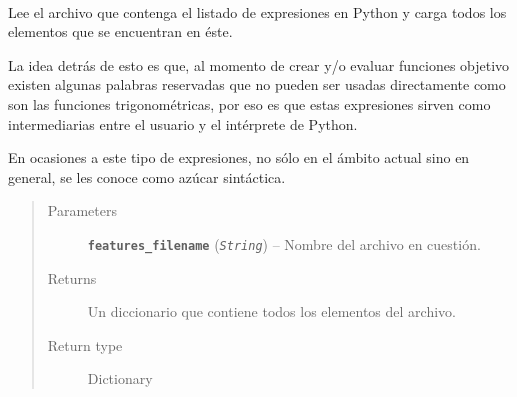 \documentclass[letterpaper,10pt,english]{sphinxmanual}
\begin{document}
\begin{fulllineitems}
\begin{fulllineitems}
\label{Controller/XMLParser:Controller.XMLParser.XMLParser.load_xml_python_expressions}~
\begin{DUlineblock}{0em}
\item[] Lee el archivo que contenga el listado de expresiones en Python
y carga todos los elementos que se encuentran en éste.
\item[] 
\item[] La idea detrás de esto es que, al momento de crear y/o evaluar
funciones objetivo existen algunas palabras reservadas que no pueden 
ser usadas directamente como son las funciones trigonométricas, por eso
es que estas expresiones sirven como intermediarias entre el usuario y
el intérprete de Python. 
\item[] 
\item[] En ocasiones a este tipo de expresiones, no sólo en el ámbito actual
sino en general, se les conoce como azúcar sintáctica.
\end{DUlineblock}
\begin{quote}\begin{description}
\item[{Parameters}] \leavevmode
\textbf{\texttt{features\_filename}} (\emph{\texttt{String}}) -- Nombre del archivo en cuestión.

\item[{Returns}] \leavevmode
Un diccionario que contiene todos los elementos
del archivo.

\item[{Return type}] \leavevmode
Dictionary

\end{description}\end{quote}

\end{fulllineitems}



\end{fulllineitems}
\end{document}
